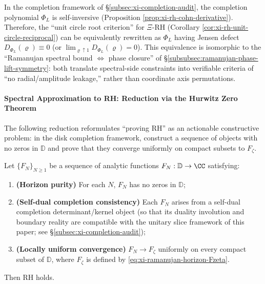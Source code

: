 \begin{corollary}\label{cor:xi-finite-ramanujan-defect-translation}
In the completion framework of \S\ref{subsec:xi-completion-audit}, the completion polynomial \(\Phi_L\) is self-inversive (Proposition \ref{prop:xi-rh-cohn-derivative}).
Therefore, the ``unit circle root criterion'' for \(\Xi\)-RH (Corollary \ref{cor:xi-rh-unit-circle-reciprocal}) can be equivalently rewritten as \(\Phi_L\) having Jensen defect \(D_{\Phi_L}(\varrho)\equiv 0\) (or \(\lim_{\varrho\uparrow 1}D_{\Phi_L}(\varrho)=0\)).
This equivalence is isomorphic to the ``Ramanujan spectral bound \(\Leftrightarrow\) phase closure'' of \S\ref{subsubsec:ramanujan-phase-lift-symmetry}: both translate spectral-side constraints into verifiable criteria of ``no radial/amplitude leakage,'' rather than coordinate axis permutations.
\end{corollary}

\paragraph{Spectral Approximation to RH: Reduction via the Hurwitz Zero Theorem}
The following reduction reformulates ``proving RH'' as an actionable constructive problem: in the disk completion framework, construct a sequence of objects with no zeros in \(\mathbb{D}\) and prove that they converge uniformly on compact subsets to \(F_{\zeta}\).

\begin{theorem}\label{thm:xi-hurwitz-horizon-reduction}
Let \(\{F_N\}_{N\ge 1}\) be a sequence of analytic functions \(F_N:\mathbb{D}\to\CC\) satisfying:
\begin{enumerate}
  \item \textbf{(Horizon purity)} For each \(N\), \(F_N\) has no zeros in \(\mathbb{D}\);
  \item \textbf{(Self-dual completion consistency)} Each \(F_N\) arises from a self-dual completion determinant/kernel object (so that its duality involution and boundary reality are compatible with the unitary slice framework of this paper; see \S\ref{subsec:xi-completion-audit});
  \item \textbf{(Locally uniform convergence)} \(F_N\to F_{\zeta}\) uniformly on every compact subset of \(\mathbb{D}\), where \(F_{\zeta}\) is defined by \eqref{eq:xi-ramanujan-horizon-Fzeta}.
\end{enumerate}
Then RH holds.
\end{theorem}

